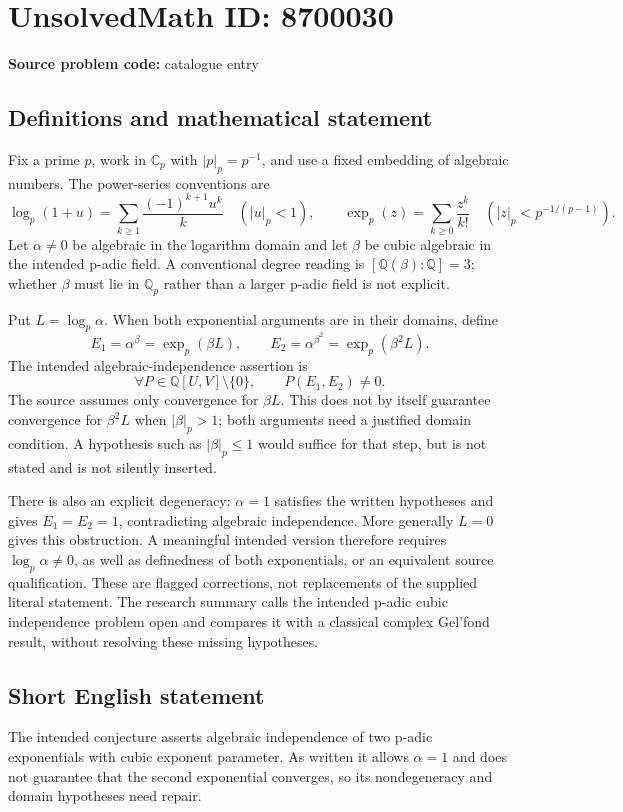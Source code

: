 \documentclass[11pt]{article}
\newcommand{\Q}{\mathbb{Q}}
\newcommand{\C}{\mathbb{C}}
\begin{document}
\section*{UnsolvedMath ID: 8700030}
\textbf{Source problem code:} catalogue entry
\subsection{Definitions and mathematical statement}
Fix a prime \(p\), work in \(\C_p\) with \(|p|_p=p^{-1}\), and use a fixed embedding of algebraic numbers. The power-series conventions are
\[
\log_p(1+u)=\sum_{k\ge1}\frac{(-1)^{k+1}u^k}{k}\quad(|u|_p<1),
\qquad
\exp_p(z)=\sum_{k\ge0}\frac{z^k}{k!}
\quad(|z|_p<p^{-1/(p-1)}).
\]
Let \(\alpha\ne0\) be algebraic in the logarithm domain and let \(\beta\) be cubic algebraic in the intended p-adic field. A conventional degree reading is \([\Q(\beta):\Q]=3\); whether \(\beta\) must lie in \(\Q_p\) rather than a larger p-adic field is not explicit.

Put \(L=\log_p\alpha\). When both exponential arguments are in their domains, define
\[
E_1=\alpha^\beta=\exp_p(\beta L),\qquad
E_2=\alpha^{\beta^2}=\exp_p(\beta^2L).
\]
The intended algebraic-independence assertion is
\[
\forall P\in\Q[U,V]\setminus\{0\},\qquad P(E_1,E_2)\ne0.
\]
The source assumes only convergence for \(\beta L\). This does not by itself guarantee convergence for \(\beta^2L\) when \(|\beta|_p>1\); both arguments need a justified domain condition. A hypothesis such as \(|\beta|_p\le1\) would suffice for that step, but is not stated and is not silently inserted.

There is also an explicit degeneracy: \(\alpha=1\) satisfies the written hypotheses and gives \(E_1=E_2=1\), contradicting algebraic independence. More generally \(L=0\) gives this obstruction. A meaningful intended version therefore requires \(\log_p\alpha\ne0\), as well as definedness of both exponentials, or an equivalent source qualification. These are flagged corrections, not replacements of the supplied literal statement. The research summary calls the intended p-adic cubic independence problem open and compares it with a classical complex Gel'fond result, without resolving these missing hypotheses.
\subsection{Short English statement}
The intended conjecture asserts algebraic independence of two p-adic exponentials with cubic exponent parameter. As written it allows \(\alpha=1\) and does not guarantee that the second exponential converges, so its nondegeneracy and domain hypotheses need repair.
\end{document}
